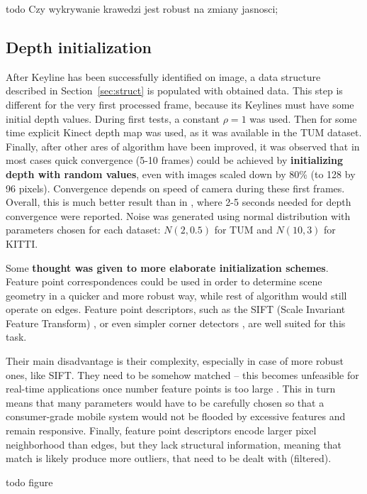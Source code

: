 todo Czy wykrywanie krawedzi jest robust na zmiany jasnosci;


\subsection{Depth initialization}

After Keyline has been successfully identified on image, a data structure described in Section~\ref{sec:struct} is populated with obtained data. This step is different for the very first processed frame, because its Keylines must have some initial depth values. During first tests, a constant $\rho = 1$ was used. Then for some time explicit Kinect depth map was used, as it was available in the TUM dataset. Finally, after other ares of algorithm have been improved, it was observed that in most cases quick convergence (5-10 frames) could be achieved by \textbf{initializing depth with random values}, even with images scaled down by 80\% (to 128 by 96 pixels). Convergence depends on speed of camera during these first frames. Overall, this is much better result than in \cite{jose2015realtime}, where 2-5 seconds needed for depth convergence were reported. Noise was generated using normal distribution with parameters chosen for each dataset: $N(2,0.5)$ for TUM and $N(10,3)$ for KITTI.


Some \textbf{thought was given to more elaborate initialization schemes}. Feature point correspondences could be used in order to determine scene geometry in a quicker and more robust way, while rest of algorithm would still operate on edges. Feature point descriptors, such as the SIFT (Scale Invariant Feature Transform) \cite{sift}, or even simpler corner detectors \cite{harris} \cite{shi1994good}, are well suited for this task.

Their main disadvantage is their complexity, especially in case of more robust ones, like SIFT. They need to be somehow matched -- this becomes unfeasible for real-time applications once number feature points is too large \cite{szczesny}. This in turn means that many parameters would have to be carefully chosen so that a consumer-grade mobile system would not be flooded by excessive features and remain responsive. Finally, feature point descriptors encode larger pixel neighborhood than edges, but they lack structural information, meaning that match is likely produce more outliers, that need to be dealt with (filtered).



todo figure



